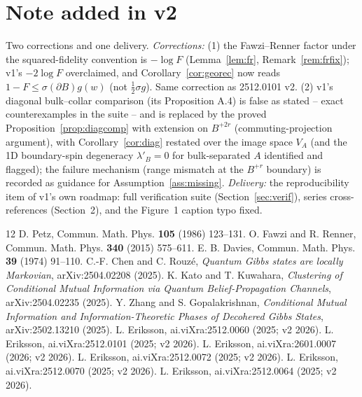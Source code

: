 \documentclass[11pt]{article}
\theoremstyle{remark}
\begin{document}
\section*{Note added in v2}
Two corrections and one delivery. \emph{Corrections:} (1) the
Fawzi--Renner factor under the squared-fidelity convention is $-\log F$
(Lemma~\ref{lem:fr}, Remark~\ref{rem:frfix}); v1's $-2\log F$ overclaimed,
and Corollary~\ref{cor:georec} now reads $1 - F \le \sigma(\partial B)
g(w)$ (not $\tfrac12\sigma g$). Same correction as 2512.0101 v2. (2) v1's
diagonal bulk--collar comparison (its Proposition A.4) is false as stated
-- exact counterexamples in the suite -- and is replaced by the proved
Proposition~\ref{prop:diagcomp} with extension on $B^{+2r}$
(commuting-projection argument), with Corollary~\ref{cor:diag} restated over the image space $V_A$
(and the 1D boundary-spin degeneracy $\lambda'_B = 0$ for bulk-separated
$A$ identified and flagged); the failure mechanism (range
mismatch at the $B^{+r}$ boundary) is recorded as guidance for
Assumption~\ref{ass:missing}. \emph{Delivery:} the reproducibility item of
v1's own roadmap: full verification suite
(Section~\ref{sec:verif}), series cross-references (Section~2), and the
Figure~1 caption typo fixed.

\begin{thebibliography}{12}
 D. Petz, Commun. Math. Phys. \textbf{105} (1986) 123--131.
 O. Fawzi and R. Renner, Commun. Math. Phys. \textbf{340}
(2015) 575--611.
 E. B. Davies, Commun. Math. Phys. \textbf{39} (1974)
91--110.
 C.-F. Chen and C. Rouz\'e, \emph{Quantum Gibbs states are
locally Markovian}, arXiv:2504.02208 (2025).
 K. Kato and T. Kuwahara, \emph{Clustering of Conditional
Mutual Information via Quantum Belief-Propagation Channels},
arXiv:2504.02235 (2025).
 Y. Zhang and S. Gopalakrishnan, \emph{Conditional Mutual
Information and Information-Theoretic Phases of Decohered Gibbs States},
arXiv:2502.13210 (2025).
 L. Eriksson, ai.viXra:2512.0060 (2025; v2 2026).
 L. Eriksson, ai.viXra:2512.0101 (2025; v2 2026).
 L. Eriksson, ai.viXra:2601.0007 (2026; v2 2026).
 L. Eriksson, ai.viXra:2512.0072 (2025; v2 2026).
 L. Eriksson, ai.viXra:2512.0070 (2025; v2 2026).
 L. Eriksson, ai.viXra:2512.0064 (2025; v2 2026).
\end{thebibliography}
\end{document}
